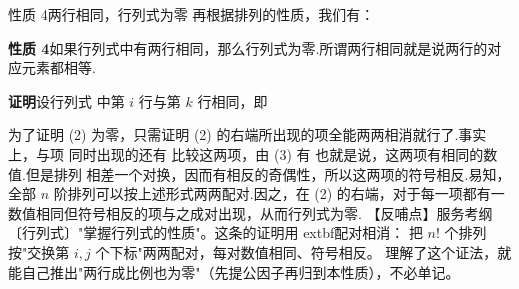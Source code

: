 \begin{fdeep}{性质 4\quad 两行相同，行列式为零}
再根据排列的性质，我们有：

\textbf{性质 4}\quad 如果行列式中有两行相同，那么行列式为零.所谓两行相同就是说两行的对应元素都相等.

\textbf{证明}\quad 设行列式
中第 $i$ 行与第 $k$ 行相同，即

为了证明 (2) 为零，只需证明 (2) 的右端所出现的项全能两两相消就行了.事实上，与项
同时出现的还有
比较这两项，由 (3) 有
也就是说，这两项有相同的数值.但是排列
相差一个对换，因而有相反的奇偶性，所以这两项的符号相反.易知，全部 $n$ 阶排列可以按上述形式两两配对.因之，在 (2) 的右端，对于每一项都有一数值相同但符号相反的项与之成对出现，从而行列式为零.
【反哺点】服务考纲〔行列式〕"掌握行列式的性质"。这条的证明用	extbf{配对相消}：
把 $n!$ 个排列按"交换第 $i,j$ 个下标"两两配对，每对数值相同、符号相反。
理解了这个证法，就能自己推出"两行成比例也为零"（先提公因子再归到本性质），不必单记。
\end{fdeep}

